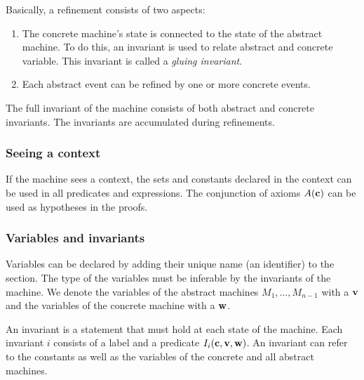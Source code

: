 Basically, a refinement consists of two aspects:
\begin{enumerate}
	\item The concrete machine's state is connected to the state of the
      abstract machine. To do this, an invariant is used to relate abstract and concrete variable. 
      This invariant is called a \emph{gluing invariant}. 
	\item Each abstract event can be refined by one or more
concrete events.
\end{enumerate}

The full invariant of the machine consists of both abstract and concrete invariants. 
The invariants are accumulated during refinements.


\subsubsection{Seeing a context}
If the machine sees a context, the sets and constants declared in the context can be used in
 all predicates and expressions.
The conjunction of axioms $A(\mathbf{c})$ can be used as hypotheses in the proofs.

\subsubsection{Variables and invariants}
Variables can be declared by adding their unique name (an identifier) to the  section. 
The type of the variables must be inferable by the invariants of the machine.
We denote the variables of the abstract machines $M_1,\ldots,M_{n-1}$ with a $\mathbf{v}$ and the variables of the concrete machine with a $\mathbf{w}$.

An invariant is a statement that must hold at each state of the machine.
Each invariant $i$ consists of a label and a predicate $I_i(\mathbf{c},\mathbf{v},\mathbf{w})$.
An invariant can refer to the constants as well as the variables of the concrete and all abstract machines.

